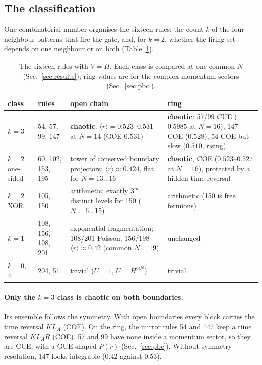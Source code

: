 \subsection{The classification}
One combinatorial number organises the sixteen rules: the count $k$ of the four neighbour patterns that fire the gate,
and, for $k=2$, whether the firing set depends on one neighbour or on both (Table~\ref{tab:summary-classes}).
\begin{table}[h]
\centering\small
\begin{tabular}{p{}p{}p{}p{}}
\toprule
class & rules & open chain & ring \\
\midrule
$k=3$ & 54, 57, 99, 147 & \textbf{chaotic}: $\langle r\rangle=0.523$--$0.531$ at $N=14$ (GOE 0.531) & \textbf{chaotic}: 57/99 CUE
($0.5985$ at $N=16$), 147 COE ($0.528$), 54 COE but slow ($0.510$, rising) \\
$k=2$ one-sided & 60, 102, 153, 195 & tower of conserved boundary projectors; $\langle r\rangle\approx0.424$, flat for
$N=13\ldots16$ & \textbf{chaotic}, COE ($0.523$--$0.527$ at $N=16$), protected by a hidden time reversal \\
$k=2$ XOR & 105, 150 & arithmetic: exactly $3^m$ distinct levels for 150 ($N=6\ldots15$) & arithmetic (150 is free
fermions) \\
$k=1$ & 108, 156, 198, 201 & exponential fragmentation; 108/201 Poisson, 156/198 $\langle r\rangle\approx0.42$ (common
$N=19$) & unchanged \\
$k=0$, $4$ & 204, 51 & trivial ($U=1$, $U=H^{\otimes N}$) & trivial \\
\bottomrule
\end{tabular}
\caption{The sixteen rules with $V=H$. Each class is compared at one common $N$ (Sec.~\ref{sec:results}); ring values are
for the complex momentum sectors (Sec.~\ref{sec:pbc}).}
\label{tab:summary-classes}
\end{table}

\paragraph{Only the $k=3$ class is chaotic on both boundaries.} Its ensemble follows the symmetry. With open boundaries
every block carries the time reversal $KL_A$ (COE). On the ring, the mirror rules 54 and 147 keep a time reversal $KL_AR$
(COE). 57 and 99 have none inside a momentum sector, so they are CUE, with a GUE-shaped $P(r)$ (Sec.~\ref{sec:pbc}).
Without symmetry resolution, 147 looks integrable ($0.42$ against $0.53$).

